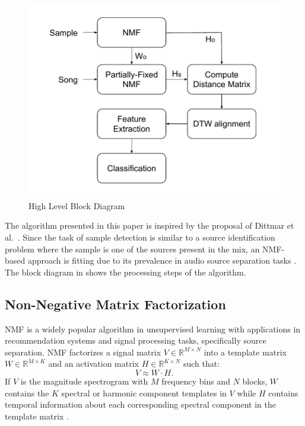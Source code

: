 \documentclass{article}
\begin{document}
\begin{figure}[t]
\centering
\includegraphics[width=\linewidth]{block_diagram.pdf}
\caption{High Level Block Diagram}
\label{fig_block}
\end{figure}

The algorithm presented in this paper is inspired by the proposal of Dittmar et al.~\cite{dittmar2012audio}. Since the task of sample detection is similar to a source identification problem where the sample is one of the sources present in the mix, an NMF-based approach is fitting due to its prevalence in audio source separation tasks \cite{schmidt2006nonnegative, ozerov2010multichannel}. The block diagram in  shows the processing steps of the algorithm.

\subsection{Non-Negative Matrix Factorization}
NMF is a widely popular algorithm in unsupervised learning with applications in recommendation systems\cite{ma2008sorec,koren2009matrix,luo2014efficient} and signal processing tasks, specifically source separation\cite{lee1999learning,smaragdis2014static,virtanen2007monaural}. NMF factorizes a signal matrix $V \in \mathbb{R}^{M\times N}$ into a template matrix $W \in \mathbb{R}^{M\times K}$ and an activation matrix $H \in \mathbb{R}^{K\times N}$ such that:
\begin{equation}
    V \approx W\cdot H.
\end{equation}
If $V$ is the magnitude spectrogram with $M$ frequency bins and $N$ blocks, $W$ contains the $K$ spectral or harmonic component templates in $V$ while $H$ contains temporal information about each corresponding spectral component in the template matrix \cite{smaragdis2003non}.
\end{document}
